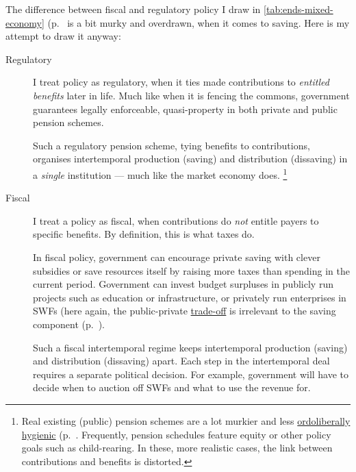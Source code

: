 The difference between fiscal and regulatory policy I draw in \autoref{tab:ends-mixed-economy} (p.~\pageref{tab:ends-mixed-economy} is a bit murky and overdrawn, when it comes to saving.
 Here is my attempt to draw it anyway:
\begin{description}
	\item[Regulatory] I treat policy as regulatory, when it ties made contributions to \emph{entitled benefits} later in life.
	Much like when it is fencing the commons, government guarantees legally enforceable, quasi-property in both private and public pension schemes.

	Such a regulatory pension scheme, tying benefits to contributions, organises intertemporal production (saving) and distribution (dissaving) in a \emph{single} institution --- much like the market economy does.
	\footnote{
		Real existing (public) pension schemes are a lot murkier and less \hyperref[sec:ordoliberal-hygiene]{ordoliberally hygienic} (p.~\pageref{sec:ordoliberal-hygiene}.
		Frequently, pension schedules feature equity or other policy goals such as child-rearing.
		In these, more realistic cases, the link between contributions and benefits is distorted.
	}

	\item[Fiscal] I treat a policy as fiscal, when contributions do \emph{not} entitle payers to specific benefits.
	By definition, this is what taxes do.

	In fiscal policy, government can encourage private saving with clever subsidies or save resources itself by raising more taxes than spending in the current period.
	Government can invest budget surpluses in publicly run projects such as education or infrastructure, or privately run enterprises in \glspl{SWF} (here again, the public-private \hyperref[sec:trade-offs]{trade-off} is irrelevant to the saving component (p.~\pageref{trade-offs}).

	Such a fiscal intertemporal regime keeps intertemporal production (saving) and distribution (dissaving) apart.
	Each step in the intertemporal deal requires a separate political decision.
	For example, government will have to decide when to auction off \glspl{SWF} and what to use the revenue for.
\end{description}

